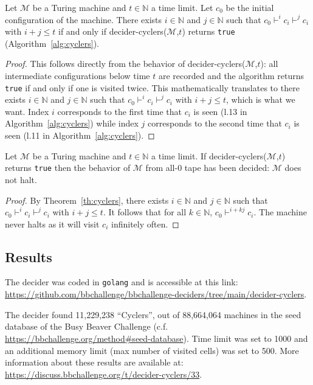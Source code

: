 \begin{theorem}\label{th:cyclers}\normalfont Let $\mathcal{M}$ be a Turing machine and $t \in \mathbb{N}$ a time limit. Let $c_0$ be the initial configuration of the machine. There exists $i\in\mathbb{N}$ and $j\in\mathbb{N}$ such that $c_0 \vdash^i c_i \vdash^j c_i$ with $i+j \leq t$ if and only if {\sc decider-cyclers}($\mathcal{M}$,$t$) returns \texttt{true} (Algorithm~\ref{alg:cyclers}).
\end{theorem}
\begin{proof}
        This follows directly from the behavior of {\sc decider-cyclers}($\mathcal{M}$,$t$): all intermediate configurations below time $t$ are recorded and the algorithm returns \texttt{true} if and only if one is visited twice. This mathematically translates to
        there exists $i\in\mathbb{N}$ and $j\in\mathbb{N}$ such that $c_0 \vdash^i c_i \vdash^j c_i$ with $i+j \leq t$, which is what we want. Index $i$ corresponds to the first time that $c_i$ is seen (l.13 in Algorithm~\ref{alg:cyclers}) while index $j$ corresponds to the second time that $c_i$ is seen (l.11 in Algorithm~\ref{alg:cyclers}).
\end{proof}

\begin{corollary}\normalfont
        Let $\mathcal{M}$ be a Turing machine and $t \in \mathbb{N}$ a time limit. If {\sc decider-cyclers}($\mathcal{M}$,$t$) returns \texttt{true} then the behavior of $\mathcal{M}$ from all-0 tape has been decided: $\mathcal{M}$ does not halt.
\end{corollary}
\begin{proof}
        By Theorem~\ref{th:cyclers}, there exists $i\in\mathbb{N}$ and $j\in\mathbb{N}$ such that $c_0 \vdash^i c_i \vdash^j c_i$ with $i+j \leq t$. It follows that for all $k\in\mathbb{N}$, $c_0 \vdash^{i+kj} c_i$. The machine never halts as it will visit $c_i$ infinitely often.
\end{proof}

\subsection{Results}

The decider was coded in \texttt{golang} and is accessible at this link: \url{https://github.com/bbchallenge/bbchallenge-deciders/tree/main/decider-cyclers}.

The decider found 11,229,238 ``Cyclers'', out of 88,664,064 machines in the seed database of the Busy Beaver Challenge (c.f. \url{https://bbchallenge.org/method#seed-database}). Time limit was set to 1000 and an additional memory limit (max number of visited cells) was set to 500. More information about these results are available at: \url{https://discuss.bbchallenge.org/t/decider-cyclers/33}.
